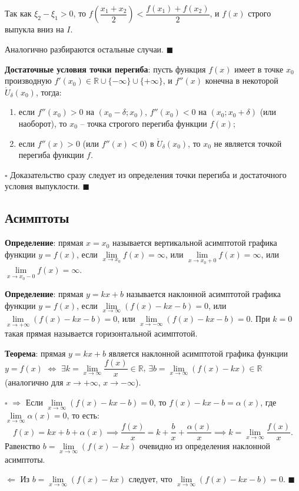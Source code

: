\documentclass[12pt, a4paper, reqno]{article}
\begin{document}
    Так как $\xi_2 - \xi_1 > 0$, то $f\left(\dfrac{x_1 + x_2}{2}\right) < \dfrac{f(x_1) + f(x_2)}{2}$,
    и $f(x)$ строго выпукла вниз на $I$.

    Аналогично разбираются остальные случаи. $\blacksquare$

    \textbf{Достаточные условия точки перегиба}: пусть функция $f(x)$ имеет в точке $x_0$ производную
    $f'(x_0)\in\mathbb{R}\cup\{-\infty\}\cup\{+\infty\}$, и $f''(x)$ конечна в некоторой
    $\mathring U_{\delta}(x_0)$, тогда:
    \begin{enumerate}
        \item если $f''(x_0) > 0$ на $(x_0 - \delta; x_0)$, $f''(x_0) < 0$ на $(x_0; x_0 + \delta)$
              (или наоборот), то $x_0$ -- точка строгого перегиба функции $f(x)$;
        \item если $f''(x) > 0$ (или $f''(x) < 0$) в $\mathring U_{\delta}(x_0)$, то $x_0$ не является
              точкой перегиба функции $f$.
    \end{enumerate}

    $\square$ Доказательство сразу следует из определения точки перегиба и достаточного условия
    выпуклости. $\blacksquare$

\subsection{Асимптоты}

    \textbf{Определение}: прямая $x = x_0$ называется вертикальной асимптотой графика функции
    $y = f(x)$, если $\lim\limits_{x\to x_0} f(x) = \infty$, или $\lim\limits_{x\to x_0 + 0}
    f(x) = \infty$, или $\lim\limits_{x\to x_0 - 0} f(x) = \infty$.

    \textbf{Определение}: прямая $y = kx + b$ называется наклонной асимптотой графика функции
    $y = f(x)$, если $\lim\limits_{x\to\infty} (f(x) - kx - b) = 0$, или $\lim\limits_{x\to +\infty}
    (f(x) - kx - b) = 0$, или $\lim\limits_{x\to -\infty} (f(x) - kx - b) = 0$. При $k = 0$ такая
    прямая называется горизонтальной асимптотой.

    \textbf{Теорема}: прямая $y = kx + b$ является наклонной асимптотой графика функции $y = f(x)$
    $\iff$ $\exists k = \lim\limits_{x\to\infty}\dfrac{f(x)}{x}\in\mathbb{R}$,
    $\exists b = \lim\limits_{x\to\infty} (f(x) - kx)\in\mathbb{R}$ (аналогично для $x\to +\infty$,
    $x\to -\infty$).

    $\square$ $\boxed{\Rightarrow}$ Если $\lim\limits_{x\to\infty} (f(x) - kx - b) = 0$, то
    $f(x) - kx - b = \alpha(x)$, где $\lim\limits_{x\to\infty}\alpha(x) = 0$, то есть:
    \begin{equation*}
        f(x) = kx + b + \alpha(x) \implies \dfrac{f(x)}{x} = k + \dfrac{b}{x} + \dfrac{\alpha(x)}{x}
        \implies k = \lim\limits_{x\to\infty}\dfrac{f(x)}{x}.
    \end{equation*}
    Равенство $b = \lim\limits_{x\to\infty} (f(x) - kx)$ очевидно из определения наклонной асимптоты.

    $\boxed{\Leftarrow}$ Из $b = \lim\limits_{x\to\infty} (f(x) - kx)$ следует, что
    $\lim\limits_{x\to\infty} (f(x) - kx - b) = 0$. $\blacksquare$
\end{document}
